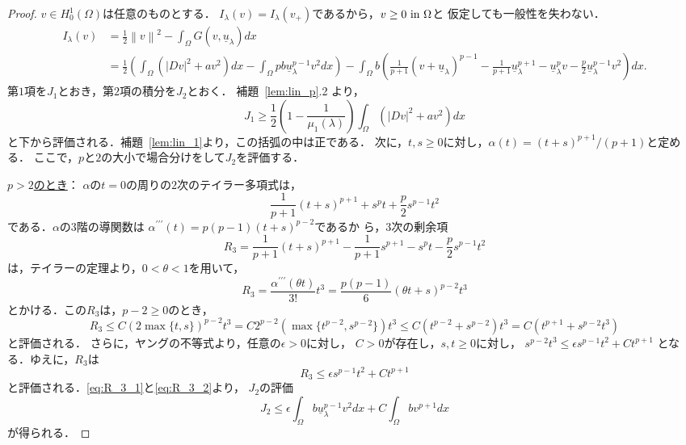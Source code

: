 \begin{proof}
 $v \in H_0^1(\Omega)$は任意のものとする．
 $I_\lambda(v) = I_\lambda(v_+)$であるから，$v \geq 0 ~\text{in}~ \Omega$と
 仮定しても一般性を失わない．
 \begin{align*}
  I_\lambda(v) &= \frac{1}{2} \left\| v \right\|^2 - \int_\Omega G(v,
  \underline{u}_\lambda)dx \\
  &= \frac{1}{2} \left( \int_\Omega \left( \lvert Dv \rvert^2 + a v^2
  \right) dx -\int_\Omega pb\underline{u}_\lambda^{p-1} v^2 dx
  \right)
  - \int_\Omega b \left( \frac{1}{p+1}(v +
  \underline{u}_\lambda)^{p-1} - \frac{1}{p+1}
  \underline{u}_\lambda^{p+1} - \underline{u}_\lambda^p v -
  \frac{p}{2} \underline{u}_\lambda^{p-1} v^2 \right) dx.
 \end{align*}
 第$1$項を$J_1$とおき，第$2$項の積分を$J_2$とおく．
 補題~\ref{lem:lin_p}.2 より，
 \begin{equation}
  J_1 \geq \frac{1}{2} \left( 1 - \frac{1}{\mu_1(\lambda)} \right)
   \int_\Omega \left( \lvert Dv \rvert^2 + a v^2 \right) dx \label{eq:J1}
 \end{equation}
 と下から評価される．補題~\ref{lem:lin_1}より，この括弧の中は正である．
 次に，$t, s \geq 0$に対し，$\alpha(t) = (t+s)^{p+1}/(p+1)$と定める．
 ここで，$p$と$2$の大小で場合分けをして$J_2$を評価する．

 \underline{{$p > 2$}のとき}：
 $\alpha$の$t = 0$の周りの$2$次のテイラー多項式は，
 \[
 \frac{1}{p+1} (t+s)^{p+1} + s^p t + \frac{p}{2}s^{p-1}t^2
 \]
 である．$\alpha$の$3$階の導関数は
 $\alpha^{\prime\prime\prime}(t) = p(p-1)(t+s)^{p-2}$であるか
 ら，$3$次の剰余項
 \begin{equation}
  R_3 = \frac{1}{p+1}(t+s)^{p+1} - 
 \frac{1}{p+1} s^{p+1} - s^p t - \frac{p}{2}s^{p-1}t^2 \label{eq:R_3_1}
 \end{equation}
 は，テイラーの定理より，$0 < \theta < 1$を用いて，
 \[
  R_3 = \frac{\alpha^{\prime\prime\prime}(\theta t)}{3!} t^3 =
 \frac{p(p-1)}{6} (\theta t + s)^{p-2} t^3
 \]
 とかける．この$R_3$は，$p - 2 \geq 0$のとき，
 \begin{equation}  
  R_3  \leq C (2 \max \{ t, s \})^{p-2} t^3 
   = C 2^{p-2} ( \max \{ t^{p-2}, s^{p-2} \})t^3
   \leq  C ( t^{p-2} + s^{p-2} )t^3
   = C ( t^{p+1} + s^{p-2} t^3) \label{eq:R_3_2_pow}
 \end{equation}
 と評価される．
 さらに，ヤングの不等式より，任意の$\epsilon > 0$に対し，
 $C > 0$が存在し，$s, t \geq 0$に対し，
 $s^{p-2} t^3 \leq \epsilon s^{p-1} t^2 + C t^{p+1}$
 となる．ゆえに，$R_3$は
 \begin{equation}
  R_3 \leq \epsilon s^{p-1}t^2 + C t^{p+1} \label{eq:R_3_2}
 \end{equation}
 と評価される．\eqref{eq:R_3_1}と\eqref{eq:R_3_2}より，
 $J_2$の評価
 \begin{equation}
  J_2 \leq \epsilon \int_\Omega b \underline{u}_\lambda^{p-1} v^2 dx +
   C \int_\Omega b v^{p+1} dx \label{eq:J2}
 \end{equation}
 が得られる．


\end{proof}
